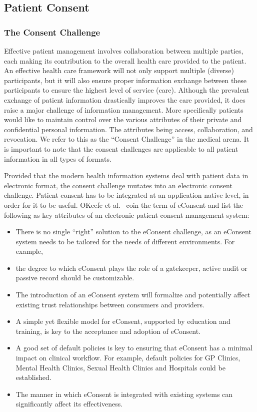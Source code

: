 \documentclass[conference]{IEEEtran}
\begin{document}
\subsection{Patient Consent}
\label{pat-consent}

\subsubsection*{The Consent Challenge}
Effective patient management involves collaboration between multiple parties, each making its contribution to the overall health care provided to the patient. 
An effective health care framework will not only support multiple (diverse) participants, but it will also ensure proper information exchange between these
participants to ensure the highest level of service (care).  Although the prevalent exchange of patient information drastically improves the care provided, it
does raise a major challenge of information management.  More specifically patients would like to maintain control over the various attributes of their private
and confidential personal information.  The attributes being access, collaboration, and revocation.  We refer to this as the “Consent Challenge” in the medical
arena.  It is important to note that the consent challenges are applicable to all patient information in all types of formats.  

Provided that the modern health information systems deal with patient data in electronic format, the consent challenge mutates into an electronic consent
challenge.  Patient consent has to be integrated at an application native level, in order for it to be useful. OKeefe et al.~\cite{okeefe2002implementation}
coin the term of eConsent and list the following as key attributes of an electronic patient consent management system:

\begin{itemize}
 \item There is no single “right” solution to the eConsent challenge, as an eConsent system needs to be tailored for the needs of different environments. For
example,
\item the degree to which eConsent plays the role of a gatekeeper, active audit or passive record should be customizable. 
\item The introduction of an eConsent system will formalize and potentially affect existing trust relationships between consumers and providers. 
\item A simple yet flexible model for eConsent, supported by education and training, is key to the acceptance and adoption of eConsent. 
\item A good set of default policies is key to ensuring that eConsent has a minimal impact on clinical workflow. For example, default policies for GP Clinics,
Mental Health Clinics, Sexual Health Clinics and Hospitals could be established. 
\item The manner in which eConsent is integrated with existing systems can significantly affect its effectiveness. 
\end{itemize}
\end{document}
